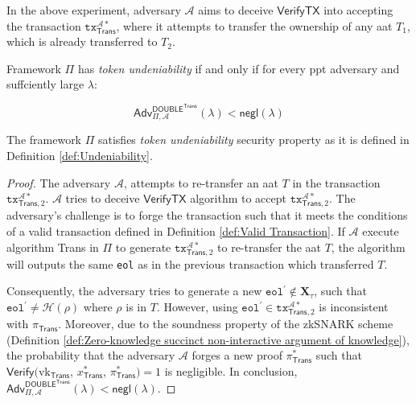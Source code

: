 In the above experiment, adversary $\mathcal{A}$ aims to deceive \( \mathsf{VerifyTX} \) into accepting the transaction \( \texttt{tx}^{\mathcal{A}*}_{\mathsf{Trans}} \), where it attempts to transfer the ownership of any \gls{aat} \( T_1 \), which is already transferred to \( T_2 \).

    \begin{definition}
    \label{def:Undeniability}
    Framework $\Pi$ has \textit{token undeniability}  if and only if for every \gls{ppt} adversary and suffciently large $\lambda$:

    \begin{equation*}
        \mathsf{Adv}^{\mathsf{DOUBLE}^\mathsf{Trans}}_{\Pi, \mathcal{A}}(\lambda) < \mathsf{negl}(\lambda)
    \end{equation*}
    \end{definition}
    
\label{app-sec:Token Undeniability}
\begin{theorem}
The framework $\Pi$ satisfies \textit{token undeniability} security property as it is defined in Definition \ref{def:Undeniability}.
\end{theorem}

\begin{proof}
    The adversary $\mathcal{A}$, attempts to re-transfer an \gls{aat} $T$ in the transaction $\texttt{tx}_{\mathsf{Trans},2}^{\mathcal{A}\ast}$. $\mathcal{A}$ tries to deceive $\mathsf{VerifyTX}$ algorithm to accept $\texttt{tx}_{\mathsf{Trans},2}^{\mathcal{A}\ast}$. The adversary's challenge is to forge the transaction such that it meets the conditions of a valid transaction defined in Definition \ref{def:Valid Transaction}. If $\mathcal{A}$ execute algorithm \textsf{Trans} in $\Pi$ to generate $\texttt{tx}_{\mathsf{Trans},2}^{\mathcal{A}\ast}$ to re-transfer the \gls{aat} $T$, the algorithm will outputs the same \texttt{eol} as in the previous transaction which transferred $T$.
    
    Consequently, the adversary tries to generate a new $\texttt{eol}^\prime \notin \mathbf{X}_\tau$, such that $\texttt{eol}^\prime \neq \mathcal{H}(\rho)$ where $\rho$ is in $T$. However, using  $\texttt{eol}^\prime \in  \texttt{tx}_{\mathsf{Trans},2}^{\mathcal{A}\ast}$ is inconsistent with $\pi_\mathsf{Trans}$. Moreover, due to the soundness property of the zkSNARK scheme (Definition \ref{def:Zero-knowledge succinct non-interactive argument of knowledge}), the probability that the adversary $\mathcal{A}$  forges a new proof $\pi^\ast_\mathsf{Trans}$ such that $\mathsf{Verify}(\text{vk}_\mathsf{Trans}$, $x^\ast_\mathsf{Trans}$, $\pi^\ast_\mathsf{Trans}) = 1$ is negligible. In conclusion, $\mathsf{Adv}^{\mathsf{DOUBLE}^\mathsf{Trans}}_{\Pi, \mathcal{A}}(\lambda) < \mathsf{negl}(\lambda)$.
        
\end{proof}



